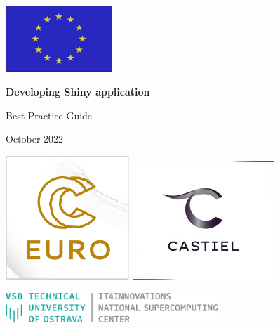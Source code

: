\documentclass[
]{article}
\author{}
\date{\vspace{-2.5em}}
\begin{document}
\begin{center}

  \includegraphics[width=0.3\textwidth]{media/image1.jpeg}

  \bigskip \bigskip \bigskip \bigskip \bigskip 

  \LARGE\textbf{Developing Shiny application}

  \bigskip \bigskip \bigskip 

  \LARGE{Best Practice Guide}
  
  \bigskip \bigskip

  \large{October 2022}

  \bigskip \bigskip \bigskip \bigskip \bigskip 

  \includegraphics[width=0.35\textwidth]{media/image2.png}
  \qquad \qquad
  \includegraphics[width=0.4\textwidth]{media/image3.png}

  \bigskip \bigskip \bigskip \bigskip \bigskip 

  \includegraphics[width=0.6\textwidth]{media/image4.png}
\end{center}

\newpage
\tableofcontents
\newpage
\end{document}
